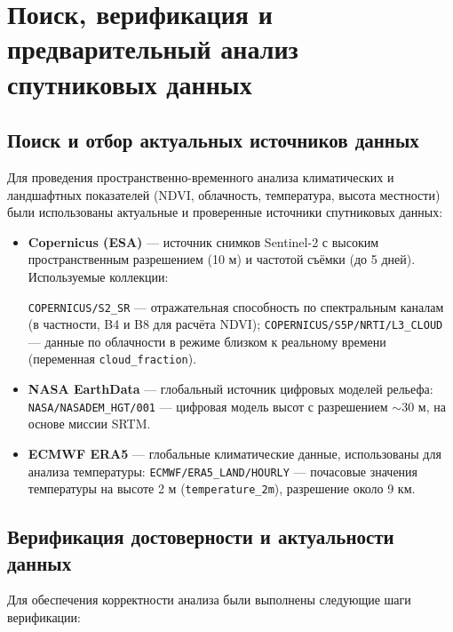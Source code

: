 \chapter{Поиск, верификация и предварительный анализ спутниковых данных}

\section{Поиск и отбор актуальных источников данных}

Для проведения пространственно-временного анализа климатических и ландшафтных показателей (NDVI, облачность, температура, высота местности) были использованы актуальные и проверенные источники спутниковых данных:

\begin{itemize}
	\item \textbf{Copernicus (ESA)} — источник снимков Sentinel-2 с высоким пространственным разрешением (10 м) и частотой съёмки (до 5 дней). Используемые коллекции:

		 \texttt{COPERNICUS/S2\_SR} — отражательная способность по спектральным каналам (в частности, B4 и B8 для расчёта NDVI);
		 \texttt{COPERNICUS/S5P/NRTI/L3\_CLOUD} — данные по облачности в режиме близком к реальному времени (переменная \texttt{cloud\_fraction}).

	\item \textbf{NASA EarthData} — глобальный источник цифровых моделей рельефа:  \texttt{NASA/NASADEM\_HGT/001} — цифровая модель высот с разрешением $\sim$30 м, на основе миссии SRTM.

	
	\item \textbf{ECMWF ERA5} — глобальные климатические данные, использованы для анализа температуры:
	 \texttt{ECMWF/ERA5\_LAND/HOURLY} — почасовые значения температуры на высоте 2 м (\texttt{temperature\_2m}), разрешение около 9 км.

\end{itemize}

\section{Верификация достоверности и актуальности данных}

Для обеспечения корректности анализа были выполнены следующие шаги верификации:

